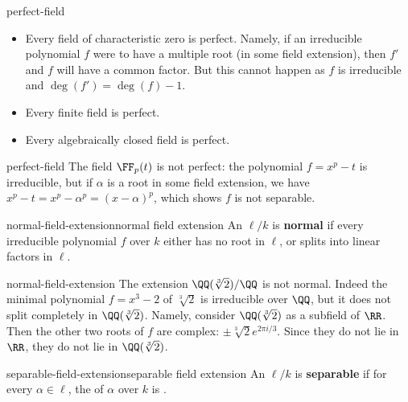 \begin{example}{perfect-field}
    \begin{itemize}
        \item Every field of characteristic zero is perfect. Namely, if an irreducible polynomial $f$ were to have a multiple root (in some field extension), then $f'$ and $f$ will have a common factor. But this cannot happen as $f$ is irreducible and $\deg(f') = \deg(f) - 1$.
        \item Every finite field is perfect.
        \item Every algebraically closed field is perfect.
    \end{itemize}
\end{example}

\begin{example}{perfect-field}
    The field $\FF_p(t)$ is not perfect: the polynomial $f = x^p - t$ is irreducible, but if $\alpha$ is a root in some field extension, we have $x^p - t = x^p - \alpha^p = (x - \alpha)^p$, which shows $f$ is not separable.
\end{example}

\begin{topic}{normal-field-extension}{normal field extension}
    An  $\ell/k$ is \textbf{normal} if every irreducible polynomial $f$ over $k$ either has no root in $\ell$, or splits into linear factors in $\ell$.
\end{topic}

\begin{example}{normal-field-extension}
    The extension $\QQ(\sqrt[3]{2}) / \QQ$ is not normal. Indeed the minimal polynomial $f = x^3 - 2$ of $\sqrt[3]{2}$ is irreducible over $\QQ$, but it does not split completely in $\QQ(\sqrt[3]{2})$. Namely, consider $\QQ(\sqrt[3]{2})$ as a subfield of $\RR$. Then the other two roots of $f$ are complex: $\pm \sqrt[3]{2} e^{2 \pi i / 3}$. Since they do not lie in $\RR$, they do not lie in $\QQ(\sqrt[3]{2})$.
\end{example}

\begin{topic}{separable-field-extension}{separable field extension}
    An   $\ell/k$ is \textbf{separable} if for every $\alpha \in \ell$, the  of $\alpha$ over $k$ is .
\end{topic}


